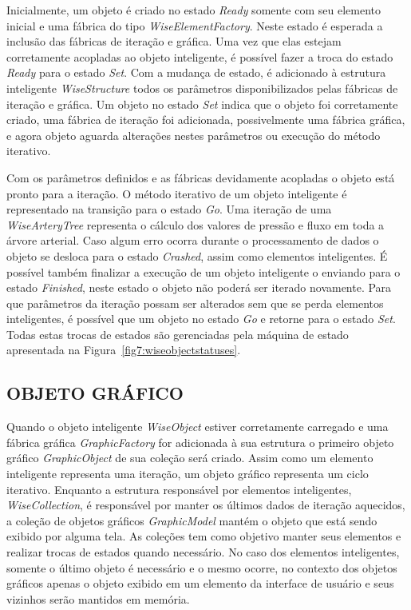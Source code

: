 Inicialmente, um objeto é criado no estado \textit{Ready} somente com seu elemento inicial e uma fábrica do tipo \textit{WiseElementFactory}. Neste estado é esperada a inclusão das fábricas de iteração e gráfica. Uma vez que elas estejam corretamente acopladas ao objeto inteligente, é possível fazer a troca do estado \textit{Ready} para o estado \textit{Set}. Com a mudança de estado, é adicionado à estrutura inteligente \textit{WiseStructure} todos os parâmetros disponibilizados pelas fábricas de iteração e gráfica. Um objeto no estado \textit{Set} indica que o objeto foi corretamente criado, uma fábrica de iteração foi adicionada, possivelmente uma fábrica gráfica, e agora objeto aguarda alterações nestes parâmetros ou execução do método iterativo.

Com os parâmetros definidos e as fábricas devidamente acopladas o objeto está pronto para a iteração. O método iterativo de um objeto inteligente é representado na transição para o estado \textit{Go}. Uma iteração de uma \textit{WiseArteryTree} representa o cálculo dos valores de pressão e fluxo em toda a árvore arterial. Caso algum erro ocorra durante o processamento de dados o objeto se desloca para o estado \textit{Crashed}, assim como elementos inteligentes. É possível também finalizar a execução de um objeto inteligente o enviando para o estado \textit{Finished}, neste estado o objeto não poderá ser iterado novamente. Para que parâmetros da iteração possam ser alterados sem que se perda elementos inteligentes, é possível que um objeto no estado \textit{Go} e retorne para o estado \textit{Set}. Todas estas trocas de estados são gerenciadas pela máquina de estado apresentada na Figura~\ref{fig7:wiseobjectstatuses}.

\subsection{OBJETO GRÁFICO}\label{sec:objeto_grafico}


Quando o objeto inteligente \textit{WiseObject} estiver corretamente carregado e uma fábrica gráfica \textit{GraphicFactory} for adicionada à sua estrutura o primeiro objeto gráfico \textit{GraphicObject} de sua coleção será criado. Assim como um elemento inteligente representa uma iteração, um objeto gráfico representa um ciclo iterativo. Enquanto a estrutura responsável por elementos inteligentes, \textit{WiseCollection}, é responsável por manter os últimos dados de iteração aquecidos, a coleção de objetos gráficos \textit{GraphicModel} mantém o objeto que está sendo exibido por alguma tela. As coleções tem como objetivo manter seus elementos e realizar trocas de estados quando necessário. No caso dos elementos inteligentes, somente o último objeto é necessário e o mesmo ocorre, no contexto dos objetos gráficos apenas o objeto exibido em um elemento da interface de usuário e seus vizinhos serão mantidos em memória.

